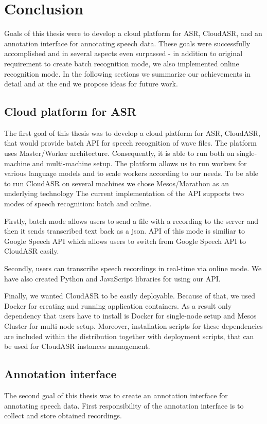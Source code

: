 \chapter*{Conclusion}

Goals of this thesis were to develop a cloud platform for ASR, CloudASR,
  and an annotation interface for annotating speech data.
These goals were successfully accomplished and in several aspects even surpassed
  - in addition to original requirement to create batch recognition mode,
  we also implemented online recognition mode.
In the following sections we summarize our achievements in detail and
  at the end we propose ideas for future work.

\section*{Cloud platform for ASR}
The first goal of this thesis was to develop a cloud platform for ASR, CloudASR,
  that would provide batch API for speech recognition of wave files.
The platform uses Master/Worker architecture.
Consequently, it is able to run both on single-machine and multi-machine setup.
The platform allows us to run workers for various language models and to scale workers according to our needs.
To be able to run CloudASR on several machines we chose Mesos/Marathon as an underlying technology
The current implementation of the API supports two modes of speech recognition: batch and online.

Firstly, batch mode allows users to send a file with a recording to the server
  and then it sends transcribed text back as a json.
API of this mode is similiar to Google Speech API
  which allows users to switch from Google Speech API to CloudASR easily.

Secondly, users can transcribe speech recordings in real-time via online mode.
We have also created Python and JavaScript libraries for using our API.


Finally, we wanted CloudASR to be easily deployable.
Because of that, we used Docker for creating and running application containers.
As a result only dependency that users have to install is Docker for single-node setup and Mesos Cluster for multi-node setup.
Moreover, installation scripts for these dependencies are included within the distribution together with deployment scripts,
  that can be used for CloudASR instances management.

\section*{Annotation interface}
The second goal of this thesis was to create an annotation interface for annotating speech data.
First responsibility of the annotation interface is to collect and store obtained recordings.

